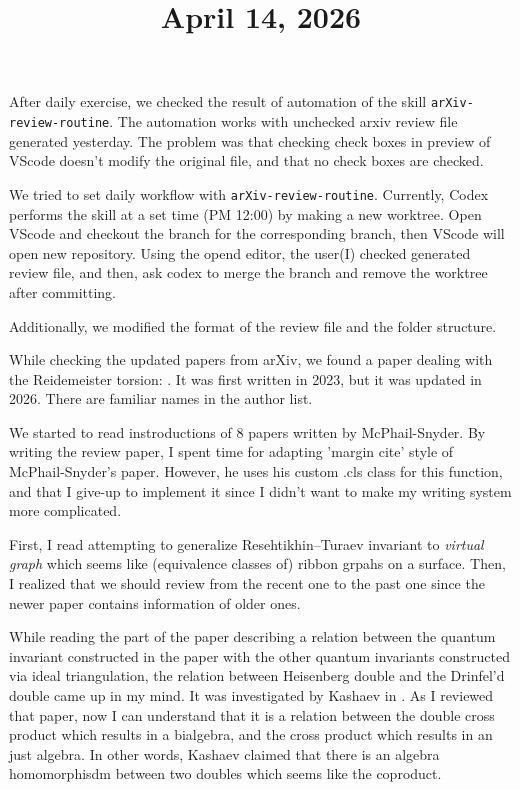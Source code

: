 \documentclass[11pt]{amsart}
\title{April 14, 2026}
\begin{document}
\maketitle

After daily exercise, we checked the result of automation of the skill \texttt{arXiv-review-routine}.
The automation works with unchecked arxiv review file generated yesterday.
The problem was that checking check boxes in preview of VScode doesn't modify the original file, and that no check boxes are checked.
\par\vspace{1em}
We tried to set daily workflow with \texttt{arXiv-review-routine}.
Currently, Codex performs the skill at a set time (PM 12:00) by making a new worktree.
Open VScode and checkout the branch for the corresponding branch, then VScode will open new repository.
Using the opend editor, the user(I) checked generated review file, and then, ask codex to merge the branch and remove the worktree after committing.

Additionally, we modified the format of the review file and the folder structure.

\par\vspace{1em}

While checking the updated papers from arXiv, we found a paper dealing with the Reidemeister torsion: \cite{Benard-Tange-Tran-Ueki-2026-nonacyclic_L_functions_Whiteheadlink}.
It was first written in 2023, but it was updated in 2026.
There are familiar names in the author list.

\par\vspace{1em}

We started to read instroductions of 8 papers written by McPhail-Snyder.
By writing the review paper, I spent time for adapting 'margin cite' style of McPhail-Snyder's paper.
However, he uses his custom .cls class for this function, and that I give-up to implement it since I didn't want to make my writing system more complicated.

First, I read \cite{McPhailSnyder_Miller-2020-planar_diagrams} attempting to generalize Resehtikhin--Turaev invariant to \textit{virtual graph} which seems like (equivalence classes of) ribbon grpahs on a surface.
Then, I realized that we should review from the recent one to the past one since the newer paper contains information of older ones.

While reading the part of the paper describing a relation between the quantum invariant constructed in the paper with the other quantum invariants constructed via ideal triangulation, the relation between Heisenberg double and the Drinfel'd double came up in my mind.
It was investigated by Kashaev in \cite{Kashaev-1996-Heisenberg_double}.
As I reviewed that paper, now I can understand that it is a relation between the double cross product which results in a bialgebra, and the cross product which results in an just algebra.
In other words, Kashaev claimed that there is an algebra homomorphisdm between two doubles which seems like the coproduct.
\end{document}
